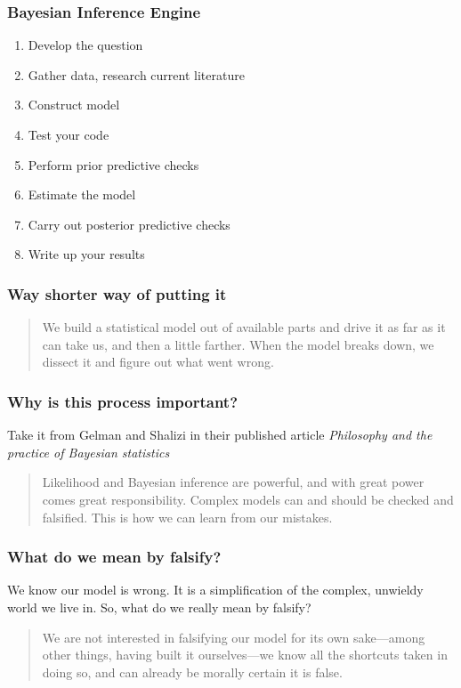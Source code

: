 \documentclass{beamer}
\begin{document}
\begin{frame}
\frametitle{Bayesian Inference Engine}

\begin{enumerate}
\item
Develop the question
\item
Gather data, research current literature
\item
Construct model
\item
Test your code
\item
Perform prior predictive checks
\item
Estimate the model
\item
Carry out posterior predictive checks
\item
Write up your results
\end{enumerate}

\end{frame}

\begin{frame}
\frametitle{Way shorter way of putting it}

\begin{quote} 
We build a statistical model out of available parts and drive it as far as it can take us, and then a little farther. When the model breaks down, we dissect it and figure out what went wrong.
\end{quote}

\end{frame}

\begin{frame}
\frametitle{Why is this process important?}

Take it from Gelman and Shalizi in their published article \emph{Philosophy and the practice of Bayesian statistics} 
\begin{quote}
Likelihood and Bayesian inference are powerful, and with great power comes great responsibility. Complex models can and should be checked and falsified. This is how we can learn from our mistakes.
\end{quote}

\end{frame}

\begin{frame}
\frametitle{What do we mean by falsify?}

We know our model is wrong. It is a simplification of the complex, unwieldy world we live in. So, what do we really mean by falsify? 
\begin{quote} 
We are not interested in falsifying our model for its own sake---among other things, having built it ourselves---we know all the shortcuts taken in doing so, and can already be morally certain it is false.
\end{quote}

\end{frame}
\end{document}
